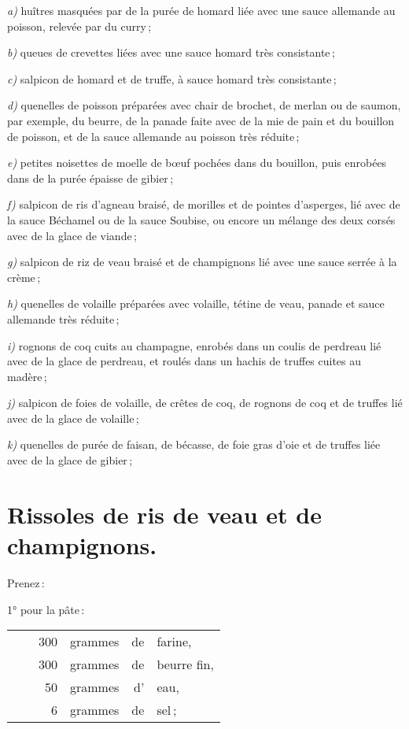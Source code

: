 \textit{a)} huîtres masquées par de la purée de homard liée avec une sauce allemande
au poisson, relevée par du curry ;

\textit{b)} queues de crevettes liées avec une sauce homard très consistante ;

\textit{c)} salpicon de homard et de truffe, à sauce homard très consistante ;

\textit{d)} quenelles de poisson préparées avec chair de brochet, de merlan ou
de saumon, par exemple, du beurre, de la panade faite avec de la mie de pain et
du bouillon de poisson, et de la sauce allemande au poisson très réduite ;

\textit{e)} petites noisettes de moelle de bœuf pochées dans du bouillon, puis
enrobées dans de la purée épaisse de gibier ;

\textit{f)} salpicon de ris d'agneau braisé, de morilles et de pointes
d'asperges, lié avec de la sauce Béchamel ou de la sauce Soubise, ou encore un
mélange des deux corsés avec de la glace de viande ;

\textit{g)} salpicon de riz de veau braisé et de champignons lié avec une sauce
serrée à la crème ;

\textit{h)} quenelles de volaille préparées avec volaille, tétine de veau,
panade et sauce allemande très réduite ;

\textit{i)} rognons de coq cuits au champagne, enrobés dans un coulis de
perdreau lié avec de la glace de perdreau, et roulés dans un hachis de truffes
cuites au madère ;

\textit{j)} salpicon de foies de volaille, de crêtes de coq, de rognons de coq
et de truffes lié avec de la glace de volaille ;

\textit{k)} quenelles de purée de faisan, de bécasse, de foie gras d'oie et de
truffes liée avec de la glace de gibier ;

\section*{\centering Rissoles de ris de veau et de champignons.}
{}

Prenez :

\medskip

1° pour la pâte :

\footnotesize
\begin{longtable}{rrrrrp{18em}}
  & \hspace{2em} &  300 & grammes & de & farine,                                                          \\
  & \hspace{2em} &  300 & grammes & de & beurre fin,                                                      \\
  & \hspace{2em} &   50 & grammes & d' & eau,                                                             \\
  & \hspace{2em} &    6 & grammes & de & sel ;
\end{longtable}
\normalsize


